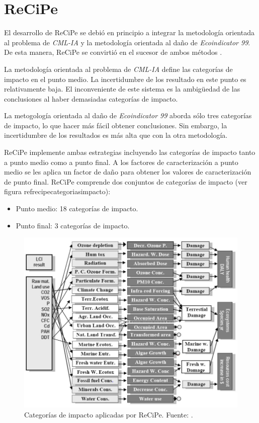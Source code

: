 \section{ReCiPe}\label{sec:recipe}

El desarrollo de ReCiPe se debió en principio a integrar la metodología orientada al problema de \textit{CML-IA} y la metodología orientada al daño de \textit{Ecoindicator 99}. De esta manera, ReCiPe se convirtió en el sucesor de ambos métodos \cite{mgoedkoop3}.

La metodología orientada al problema de \textit{CML-IA} define las categorías de impacto en el punto medio. La incertidumbre de los resultado en este punto es relativamente baja. El inconveniente de este sistema es la ambigüedad de las conclusiones al haber demasiadas categorías de impacto.

La metogología orientada al daño de \textit{Ecoindicator 99} aborda sólo tres categorías de impacto, lo que hacer más fácil obtener conclusiones. Sin embargo, la incertidumbre de los resultados es más alta que con la otra metodología.

ReCiPe implemente ambas estrategias incluyendo las categorías de impacto tanto a punto medio como a punto final. A los factores de caracterización a punto medio se les aplica un factor de daño para obtener los valores de caracterización de punto final. ReCiPe comprende dos conjuntos de categorías de impacto (ver figura ref{recipecategoriasimpacto}):
\begin{itemize}
\item Punto medio: 18 categorías de impacto.
\item Punto final: 3 categorías de impacto.
\end{itemize}

\begin{figure}[!htb]
\centering
\includegraphics[width=15cm]{recipecategoriasimpacto.png}
\caption[Categorías de impacto aplicadas por ReCiPe.]{Categorías de impacto aplicadas por ReCiPe. Fuente: \protect\cite{mgoedkoop3}.}
\label{fig:recipecategoriasimpacto}
\end{figure}


